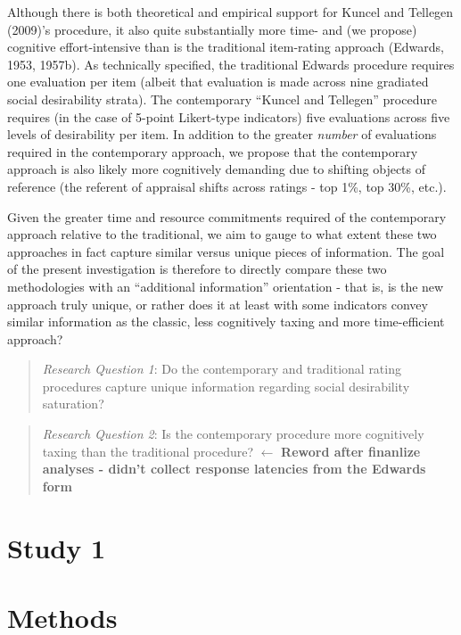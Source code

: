 \documentclass[
  ,jou]{apa6}
\begin{document}
Although there is both theoretical and empirical support for Kuncel and Tellegen (2009)'s procedure, it also quite substantially more time- and (we propose) cognitive effort-intensive than is the traditional item-rating approach (Edwards, 1953, 1957b). As technically specified, the traditional Edwards procedure requires one evaluation per item (albeit that evaluation is made across nine gradiated social desirability strata). The contemporary ``Kuncel and Tellegen'' procedure requires (in the case of 5-point Likert-type indicators) five evaluations across five levels of desirability per item. In addition to the greater \emph{number} of evaluations required in the contemporary approach, we propose that the contemporary approach is also likely more cognitively demanding due to shifting objects of reference (the referent of appraisal shifts across ratings - top 1\%, top 30\%, etc.).

Given the greater time and resource commitments required of the contemporary approach relative to the traditional, we aim to gauge to what extent these two approaches in fact capture similar versus unique pieces of information. The goal of the present investigation is therefore to directly compare these two methodologies with an ``additional information'' orientation - that is, is the new approach truly unique, or rather does it at least with some indicators convey similar information as the classic, less cognitively taxing and more time-efficient approach?

\begin{quote}
\emph{Research Question 1}: Do the contemporary and traditional rating procedures capture unique information regarding social desirability saturation?
\end{quote}

\begin{quote}
\emph{Research Question 2}: Is the contemporary procedure more cognitively taxing than the traditional procedure? \(\leftarrow\) \textbf{Reword after finanlize analyses - didn't collect response latencies from the Edwards form}
\end{quote}

\hypertarget{study-1}{%
\section{Study 1}\label{study-1}}

\hypertarget{methods}{%
\section{Methods}\label{methods}}
\end{document}
